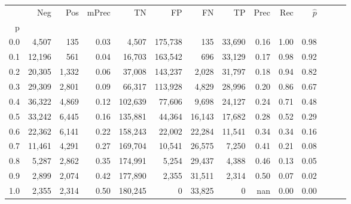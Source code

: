 \begin{tabular}{rrrrrrrrrrrrrr}
\toprule
{} &     Neg &    Pos & mPrec &       TN &       FP &      FN &      TP &  Prec &   Rec & $\hat{p}$ \\
p   &         &        &       &          &          &         &         &       &       &           \\
\midrule
0.0 &   4,507 &    135 &  0.03 &    4,507 &  175,738 &     135 &  33,690 &  0.16 &  1.00 &      0.98 \\
0.1 &  12,196 &    561 &  0.04 &   16,703 &  163,542 &     696 &  33,129 &  0.17 &  0.98 &      0.92 \\
0.2 &  20,305 &  1,332 &  0.06 &   37,008 &  143,237 &   2,028 &  31,797 &  0.18 &  0.94 &      0.82 \\
0.3 &  29,309 &  2,801 &  0.09 &   66,317 &  113,928 &   4,829 &  28,996 &  0.20 &  0.86 &      0.67 \\
0.4 &  36,322 &  4,869 &  0.12 &  102,639 &   77,606 &   9,698 &  24,127 &  0.24 &  0.71 &      0.48 \\
0.5 &  33,242 &  6,445 &  0.16 &  135,881 &   44,364 &  16,143 &  17,682 &  0.28 &  0.52 &      0.29 \\
0.6 &  22,362 &  6,141 &  0.22 &  158,243 &   22,002 &  22,284 &  11,541 &  0.34 &  0.34 &      0.16 \\
0.7 &  11,461 &  4,291 &  0.27 &  169,704 &   10,541 &  26,575 &   7,250 &  0.41 &  0.21 &      0.08 \\
0.8 &   5,287 &  2,862 &  0.35 &  174,991 &    5,254 &  29,437 &   4,388 &  0.46 &  0.13 &      0.05 \\
0.9 &   2,899 &  2,074 &  0.42 &  177,890 &    2,355 &  31,511 &   2,314 &  0.50 &  0.07 &      0.02 \\
1.0 &   2,355 &  2,314 &  0.50 &  180,245 &        0 &  33,825 &       0 &   nan &  0.00 &      0.00 \\
\bottomrule
\end{tabular}
